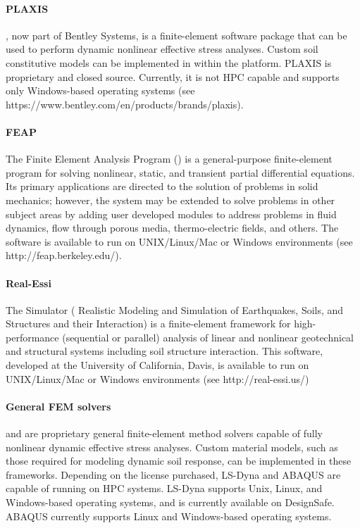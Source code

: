 \paragraph{PLAXIS}
, now part of Bentley Systems, is a finite-element software package that can be used to perform dynamic nonlinear effective stress analyses. Custom soil constitutive models can be implemented in within the platform. PLAXIS is proprietary and closed source. Currently, it is not HPC capable and supports only Windows-based operating systems (see https://www.bentley.com/en/products/brands/plaxis).

\paragraph{FEAP} The Finite Element Analysis Program () is a general-purpose finite-element program for solving nonlinear, static, and transient partial differential equations. Its primary applications are directed to the solution of problems in solid mechanics; however, the system may be extended to solve problems in other subject areas by adding user developed modules to address problems in fluid dynamics, flow through porous media, thermo-electric fields, and others. The software is available to run on UNIX/Linux/Mac or Windows environments (see http://feap.berkeley.edu/).

\paragraph{Real-Essi} The  Simulator ( Realistic Modeling and Simulation of Earthquakes, Soils, and Structures and their Interaction) is a finite-element framework for high-performance (sequential or parallel) analysis of linear and nonlinear geotechnical and structural systems including soil structure interaction. This software, developed at the University of California, Davis, is available to run on UNIX/Linux/Mac or Windows environments (see http://real-essi.us/)

\paragraph{General FEM solvers}
 and  are  proprietary general finite-element method solvers capable of fully nonlinear dynamic effective stress analyses. Custom material models, such as those required for modeling dynamic soil response, can be implemented in these frameworks. Depending on the license purchased, LS-Dyna and ABAQUS are capable of running on HPC systems. LS-Dyna supports Unix, Linux, and Windows-based operating systems, and is currently available on DesignSafe. ABAQUS currently supports Linux and Windows-based operating systems.

